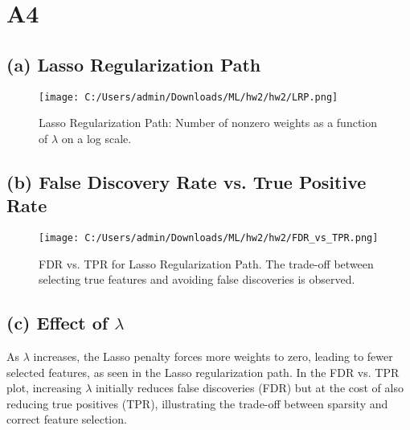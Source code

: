 \documentclass{article}
\begin{document}
\section*{A4}

\subsection*{(a) Lasso Regularization Path}
\begin{figure}[H]
    \centering
    \texttt{[image: C:/Users/admin/Downloads/ML/hw2/hw2/LRP.png]}
    \caption{Lasso Regularization Path: Number of nonzero weights as a function of $\lambda$ on a log scale.}
    \label{fig:lasso-path}
\end{figure}

\subsection*{(b) False Discovery Rate vs. True Positive Rate}
\begin{figure}[H]
    \centering
    \texttt{[image: C:/Users/admin/Downloads/ML/hw2/hw2/FDR\_vs\_TPR.png]}
    \caption{FDR vs. TPR for Lasso Regularization Path. The trade-off between selecting true features and avoiding false discoveries is observed.}
    \label{fig:fdr-tpr}
\end{figure}

\subsection*{(c) Effect of $\lambda$}
As $\lambda$ increases, the Lasso penalty forces more weights to zero, leading to fewer selected features, as seen in the Lasso regularization path. In the FDR vs. TPR plot, increasing $\lambda$ initially reduces false discoveries (FDR) but at the cost of also reducing true positives (TPR), illustrating the trade-off between sparsity and correct feature selection.

\clearpage  %
\end{document}
